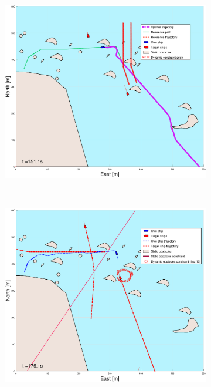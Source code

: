 \begin{figure}[ht]
\begin{subfigure}[b]{0.494\textwidth}
        \subcaption{}
    \end{subfigure}
    \hfill
    \begin{subfigure}[b]{0.494\textwidth}
        \centering
        \includegraphics[width=\textwidth]{Images/Figures/skjergard_m_trafikk_NEW/_Simple_0fig999_time=151}
        \subcaption{}
    \end{subfigure}
    \hfill
    \\
    \begin{subfigure}[b]{0.494\textwidth}
        \centering
        \includegraphics[width=\textwidth]{Images/Figures/skjergard_m_trafikk_NEW/_Simple_0fig1_time=176}

\end{subfigure}
\end{figure}
